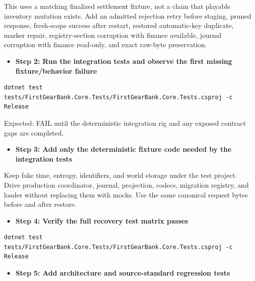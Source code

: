 \documentclass[
  10pt,
  letterpaper,
]{article}
\providecommand{\tightlist}{%
  \setlength{\itemsep}{0pt}\setlength{\parskip}{0pt}}
\begin{document}
This uses a matching finalized settlement fixture, not a claim that
playable inventory mutation exists. Add an admitted rejection retry
before staging, pruned response, fresh-scope success after restart,
restored automatic-key duplicate, marker repair, registry-section
corruption with finance available, journal corruption with finance
read-only, and exact raw-byte preservation.

\begin{itemize}
\tightlist
\item[$\square$]
  \textbf{Step 2: Run the integration tests and observe the first
  missing fixture/behavior failure}
\end{itemize}

\begin{lstlisting}
dotnet test tests/FirstGearBank.Core.Tests/FirstGearBank.Core.Tests.csproj -c Release
\end{lstlisting}

Expected: FAIL until the deterministic integration rig and any exposed
contract gaps are completed.

\begin{itemize}
\tightlist
\item[$\square$]
  \textbf{Step 3: Add only the deterministic fixture code needed by the
  integration tests}
\end{itemize}

Keep fake time, entropy, identifiers, and world storage under the test
project. Drive production coordinator, journal, projection, codecs,
migration registry, and loader without replacing them with mocks. Use
the same canonical request bytes before and after restore.

\begin{itemize}
\tightlist
\item[$\square$]
  \textbf{Step 4: Verify the full recovery test matrix passes}
\end{itemize}

\begin{lstlisting}
dotnet test tests/FirstGearBank.Core.Tests/FirstGearBank.Core.Tests.csproj -c Release
\end{lstlisting}

\begin{itemize}
\tightlist
\item[$\square$]
  \textbf{Step 5: Add architecture and source-standard regression tests}
\end{itemize}
\end{document}
